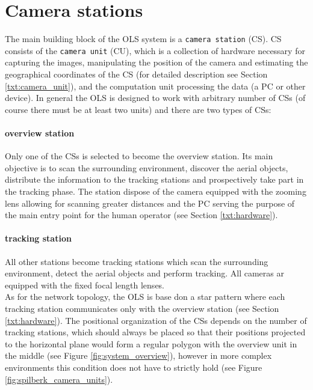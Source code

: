 \section{Camera stations}

The main building block of the OLS system is a \texttt{camera station} (CS). CS consists of the \texttt{camera unit} (CU), which is a collection of hardware necessary for capturing the images, manipulating the position of the camera and estimating the geographical coordinates of the CS (for detailed description see Section \ref{txt:camera_unit}), and the computation unit processing the data (a PC or other device). In general the OLS is designed to work with arbitrary number of CSs (of course there must be at least two units) and there are two types of CSs:

\paragraph{overview station} Only one of the CSs is selected to become the overview station. Its main objective is to scan the surrounding environment, discover the aerial objects, distribute the information to the tracking stations and prospectively take part in the tracking phase. The station dispose of the camera equipped with the zooming lens allowing for scanning greater distances and the PC serving the purpose of the main entry point for the human operator (see Section \ref{txt:hardware}).

\paragraph{tracking station} All other stations become tracking stations which scan the surrounding environment, detect the aerial objects and perform tracking. All cameras ar equipped with the fixed focal length lenses. \\

As for the network topology, the OLS is base don a star pattern where each tracking station communicates only with the overview station (see Section \ref{txt:hardware}). The positional organization of the CSs depends on the number of tracking stations, which should always be placed so that their positions projected to the horizontal plane would form a regular polygon with the overview unit in the middle (see Figure \ref{fig:system_overview}), however in more complex environments this condition does not have to strictly hold (see Figure \ref{fig:spilberk_camera_units}).
	
